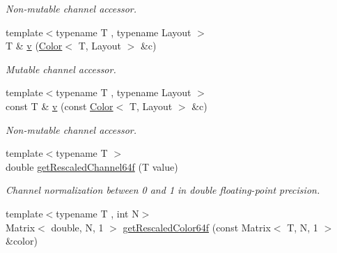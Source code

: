 \begin{DoxyCompactItemize}
\begin{DoxyCompactList}\small\item\em Non-\/mutable channel accessor. \end{DoxyCompactList}\item 
\hypertarget{group___channel_accessors_ga1dd2524c5b8d3db33137eedb803fc2ce}{{\footnotesize template$<$typename T , typename Layout $>$ }\\T \& \hyperlink{group___channel_accessors_ga1dd2524c5b8d3db33137eedb803fc2ce}{v} (\hyperlink{class_d_o_1_1_color}{Color}$<$ T, Layout $>$ \&c)}\label{group___channel_accessors_ga1dd2524c5b8d3db33137eedb803fc2ce}

\begin{DoxyCompactList}\small\item\em Mutable channel accessor. \end{DoxyCompactList}\item 
\hypertarget{group___channel_accessors_ga11fac27b0966d58ad0e9abdbcf3d71b1}{{\footnotesize template$<$typename T , typename Layout $>$ }\\const T \& \hyperlink{group___channel_accessors_ga11fac27b0966d58ad0e9abdbcf3d71b1}{v} (const \hyperlink{class_d_o_1_1_color}{Color}$<$ T, Layout $>$ \&c)}\label{group___channel_accessors_ga11fac27b0966d58ad0e9abdbcf3d71b1}

\begin{DoxyCompactList}\small\item\em Non-\/mutable channel accessor. \end{DoxyCompactList}\item 
\hypertarget{group___color_conversion_ga3e86b8eff1da0324f3aee0cef19b7d68}{{\footnotesize template$<$typename T $>$ }\\double \hyperlink{group___color_conversion_ga3e86b8eff1da0324f3aee0cef19b7d68}{get\-Rescaled\-Channel64f} (T value)}\label{group___color_conversion_ga3e86b8eff1da0324f3aee0cef19b7d68}

\begin{DoxyCompactList}\small\item\em Channel normalization between 0 and 1 in double floating-\/point precision. \end{DoxyCompactList}\item 
\hypertarget{group___color_conversion_ga77f1b557bb4f33fac18948fcd9178dd7}{{\footnotesize template$<$typename T , int N$>$ }\\Matrix$<$ double, N, 1 $>$ \hyperlink{group___color_conversion_ga77f1b557bb4f33fac18948fcd9178dd7}{get\-Rescaled\-Color64f} (const Matrix$<$ T, N, 1 $>$ \&color)}\label{group___color_conversion_ga77f1b557bb4f33fac18948fcd9178dd7}


\end{DoxyCompactItemize}

